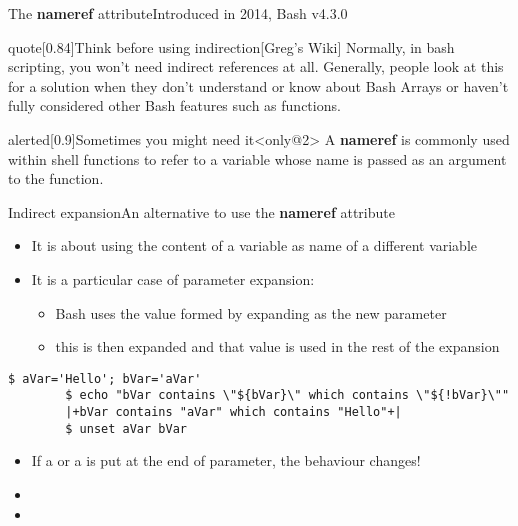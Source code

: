 \begin{frame}[fragile]{The \textbf{nameref} attribute}{Introduced in 2014, Bash v4.3.0}
\begin{varblock}{quote}[0.84\textwidth]{Think before using indirection}[Greg's Wiki]
        \smallskip
        Normally, in bash scripting, you won't need indirect references at all.
        Generally, people look at this for a solution when they don't understand or know about Bash Arrays or haven't fully considered other Bash features such as functions.
        \smallskip
    \end{varblock}
    \begin{varblock}{alerted}[0.9\textwidth]{Sometimes you might need it}<only@2>
        A \textbf{nameref} is commonly used within shell functions to refer to a variable whose name is passed as an argument to the function.
    \end{varblock}
\end{frame}
\begin{frame}[fragile]{Indirect expansion}{An alternative to use the \textbf{nameref} attribute}
    \vspace{-3mm}
    \begin{itemize}
        \item It is about using the content of a variable as name of a different variable
        \item It is a particular case of parameter expansion: 
              \begin{itemize}
                  \item Bash uses the value formed by expanding  as the new parameter
                  \item this is then expanded and that value is used in the rest of the expansion
              \end{itemize}
    \end{itemize}
    \begin{lstlisting}[style=MyBash, xrightmargin=1mm, belowskip=-4mm]
        $ aVar='Hello'; bVar='aVar'
        $ echo "bVar contains \"${bVar}\" which contains \"${!bVar}\""
        |+bVar contains "aVar" which contains "Hello"+|
        $ unset aVar bVar
    \end{lstlisting}
    \begin{itemize}[<2->]
        \item If a \PB{\texttt{*}} or a  is put at the end of parameter, the behaviour changes!\\[0.3em]
        \small\setlength{\itemsep}{0mm}
        \item[] 
        \item[] 

\end{itemize}
\end{frame}
